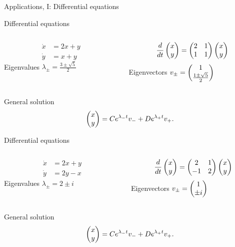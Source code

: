 \documentclass{beamer}
\begin{document}
\begin{frame}
\begin{center}
{\huge Applications, I: Differential equations}
\end{center}


\end{frame}
\begin{frame}
{Differential equations}


\begin{columns}[t]
\begin{column}{0.4\textwidth}
\begin{align*}
\dot{x}&=2x+y\\
\dot{y}&=x+y
\end{align*}
\vspace{0.5cm}
Eigenvalues \(\lambda_{\pm}=\frac{3\pm\sqrt{5}}{2}\)
\end{column}
\begin{column}{0.45\textwidth}
\[\frac{d}{dt}\begin{pmatrix} x \\ y \end{pmatrix}=\begin{pmatrix} 2 & 1\\ 1 &
1\end{pmatrix}\begin{pmatrix} x \\ y \end{pmatrix}\]
Eigenvectors \(v_{\pm}=\begin{pmatrix} 1 \\ \frac{1\pm\sqrt{5}}{2}\end{pmatrix}\)
\end{column}
\end{columns}


 General solution
\[\begin{pmatrix} x \\ y\end{pmatrix}=Ce^{\lambda_-t}v_-+De^{\lambda_+t}v_+.\]


\end{frame}
\begin{frame}
{Differential equations}


\begin{columns}[t]
\begin{column}{0.4\textwidth}
\begin{align*}
\dot{x}&=2x+y\\
\dot{y}&=2y-x
\end{align*}
\vspace{0.5cm}
Eigenvalues \(\lambda_{\pm}=2\pm i\)
\end{column}
\begin{column}{0.45\textwidth}
\[\frac{d}{dt}\begin{pmatrix} x \\ y \end{pmatrix}=\begin{pmatrix} 2 & 1\\ -1 &
2\end{pmatrix}\begin{pmatrix} x \\ y \end{pmatrix}\]
Eigenvectors \(v_{\pm}=\begin{pmatrix} 1 \\ \pm i\end{pmatrix}\)
\end{column}
\end{columns}


 General solution
\[\begin{pmatrix} x \\ y\end{pmatrix}=Ce^{\lambda_-t}v_-+De^{\lambda_+t}v_+.\]


\end{frame}
\end{document}
